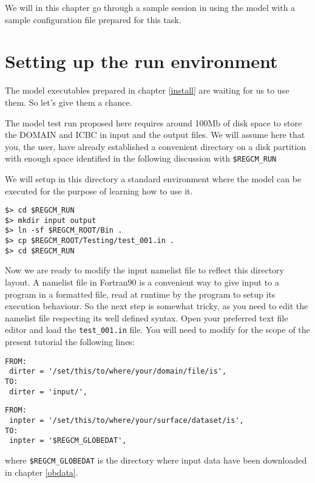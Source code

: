%
%

We will in this chapter go through a sample session in using the model with
a sample configuration file prepared for this task.

\section{Setting up the run environment}

The model executables prepared in chapter \ref{install} are waiting for us to
use them. So let's give them a chance.

The model test run proposed here requires around 100Mb of disk space to store
the DOMAIN and ICBC in input and the output files. We will assume here that you,
the user, have already established a convenient directory on a disk partition
with enough space identified in the following discussion with \verb=$REGCM_RUN=

We will setup in this directory a standard environment where the model can be
executed for the purpose of learning how to use it.

\begin{Verbatim}
$> cd $REGCM_RUN
$> mkdir input output
$> ln -sf $REGCM_ROOT/Bin .
$> cp $REGCM_ROOT/Testing/test_001.in .
$> cd $REGCM_RUN
\end{Verbatim}

Now we are ready to modify the input namelist file to reflect this directory
layout. A namelist file in Fortran90 is a convenient way to give input to a
program in a formatted file, read at runtime by the program to setup its
execution behaviour. So the next step is somewhat tricky, as you need to edit
the namelist file respecting its well defined syntax. Open your preferred text
file editor and load the \verb=test_001.in= file. You will need to modify for
the scope of the present tutorial the following lines:

\begin{Verbatim}
FROM:
 dirter = '/set/this/to/where/your/domain/file/is',
TO:
 dirter = 'input/',
\end{Verbatim}

\begin{Verbatim}
FROM:
 inpter = '/set/this/to/where/your/surface/dataset/is',
TO:
 inpter = '$REGCM_GLOBEDAT',
\end{Verbatim}

where \verb=$REGCM_GLOBEDAT= is the directory where input data have been
downloaded in chapter \ref{obdata}.

